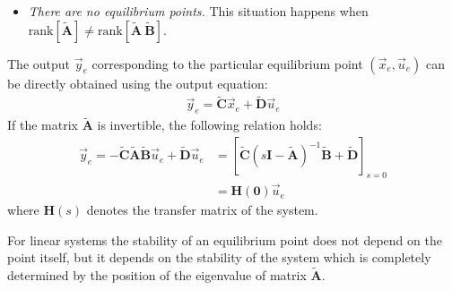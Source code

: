 \documentclass[12pt,a4paper,oneside]{book}
\begin{document}
\begin{onehalfspace}
\begin{itemize}
	happens when $\text{rank}\left[\tilde{\mathbf{A}}\right] = 
	\text{rank}\left[ \tilde{\mathbf{A}} \ \tilde{\mathbf{B}}\right]$. 
	\item \textit{There are no equilibrium points.} This situation happens when 
	$\text{rank}\left[\tilde{\mathbf{A}}\right] \ne \text{rank}\left[ 
	\tilde{\mathbf{A}} \ \tilde{\mathbf{B}}\right]$. 
\end{itemize}
The output $\vec{y}_e$ corresponding to the particular equilibrium point 
$\left( \vec{x}_e, \vec{u}_e \right) $ can be directly obtained using the 
output equation:
\begin{equation}\label{eq71}
	\begin{aligned}
		\vec{y}_e = \tilde{\mathbf{C}}\vec{x}_e+\tilde{\mathbf{D}}\vec{u}_e
	\end{aligned}
\end{equation}
If the matrix $\tilde{\mathbf{A}}$ is invertible, the following relation holds:
\begin{equation}\label{eq72}
	\begin{aligned}
		\vec{y}_e = 
		-\tilde{\mathbf{C}}\tilde{\mathbf{A}}\tilde{\mathbf{B}}\vec{u}_e+\tilde{\mathbf{D}}\vec{u}_e
		 &= \left[ \tilde{\mathbf{C}} \left( 
		s{\mathbf{I}}-\tilde{\mathbf{A}}\right)^{-1}\tilde{\mathbf{B}}+\tilde{\mathbf{D}}
		 \right]_{s=0} \\[8pt]
		&=\mathbf{H(0)}\vec{u}_e
	\end{aligned}
\end{equation}
where $\mathbf{H}(s)$ denotes the transfer matrix of the system.
\begin{mybox}
	For linear systems the stability of an equilibrium point does not depend on 
	the point itself, but it depends on the stability of the system which is 
	completely determined by the position of the eigenvalue of matrix 
	$\tilde{\mathbf{A}}$.
\end{mybox}



\end{onehalfspace}
\end{document}
